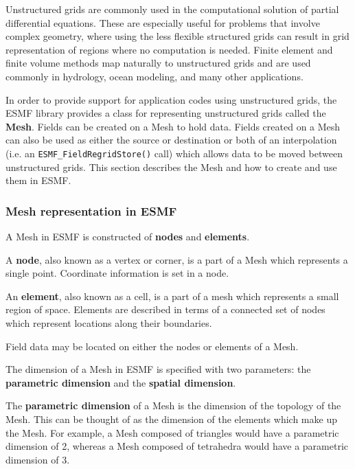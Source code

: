 
Unstructured grids are commonly used in the computational solution of partial differential 
equations.  These are especially useful for problems that involve complex geometry, where 
using the less flexible structured grids can result in grid representation of regions 
where no computation is needed.  Finite element and finite volume methods map naturally 
to unstructured grids and are used commonly in hydrology, ocean modeling, and many other 
applications.

In order to provide support for application codes using unstructured grids, the ESMF library 
provides a class for representing unstructured grids called the {\bf Mesh}. Fields can be 
created on a Mesh to hold data. Fields created on a Mesh can also be used as either the 
source or destination or both of an interpolation (i.e. an {\tt ESMF\_FieldRegridStore()} call) 
which allows data to be moved between unstructured grids. This section describes the Mesh 
and how to create and use them in ESMF. 

\subsubsection{Mesh representation in ESMF}\label{sec:meshrep}

A Mesh in ESMF is constructed of {\bf nodes} and {\bf elements}.

A {\bf node}, also known as a vertex or corner, is a part of a Mesh which represents a single point. Coordinate information is
set in a node.

An {\bf element}, also known as a cell, is a part of a mesh which represents a small 
region of space. Elements are described in terms of a connected set of nodes which represent locations along their boundaries.

Field data may be located on either the nodes or elements of a Mesh. 

\medskip

The dimension of a Mesh in ESMF is specified with two parameters: the {\bf parametric dimension} and the {\bf spatial dimension}.

The {\bf parametric dimension} of a Mesh is the dimension of the topology of the Mesh. This can be thought of as the dimension of 
the elements which make up the Mesh. For example, a Mesh composed of triangles would have a parametric dimension of 2, whereas
a Mesh composed of tetrahedra would have a parametric dimension of 3. 

